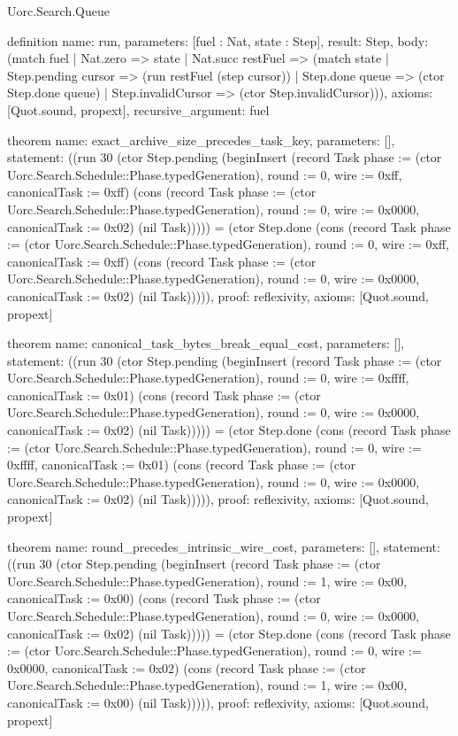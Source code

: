 \begin{lexlean}{Uorc.Search.Queue}
\begin{semanticmodule}
definition{
  name: run,
  parameters: [fuel : Nat, state : Step],
  result: Step,
  body: (match fuel
    | Nat.zero => state
    | Nat.succ restFuel => (match state
      | Step.pending cursor => (run restFuel (step cursor))
      | Step.done queue => (ctor Step.done queue)
      | Step.invalidCursor => (ctor Step.invalidCursor))),
  axioms: [Quot.sound, propext],
  recursive_argument: fuel
}

theorem{
  name: exact_archive_size_precedes_task_key,
  parameters: [],
  statement: ((run 30 (ctor Step.pending (beginInsert (record Task {phase := (ctor Uorc.Search.Schedule::Phase.typedGeneration), round := 0, wire := 0xff, canonicalTask := 0xff}) (cons (record Task {phase := (ctor Uorc.Search.Schedule::Phase.typedGeneration), round := 0, wire := 0x0000, canonicalTask := 0x02}) (nil Task))))) = (ctor Step.done (cons (record Task {phase := (ctor Uorc.Search.Schedule::Phase.typedGeneration), round := 0, wire := 0xff, canonicalTask := 0xff}) (cons (record Task {phase := (ctor Uorc.Search.Schedule::Phase.typedGeneration), round := 0, wire := 0x0000, canonicalTask := 0x02}) (nil Task))))),
  proof: reflexivity{},
  axioms: [Quot.sound, propext]
}

theorem{
  name: canonical_task_bytes_break_equal_cost,
  parameters: [],
  statement: ((run 30 (ctor Step.pending (beginInsert (record Task {phase := (ctor Uorc.Search.Schedule::Phase.typedGeneration), round := 0, wire := 0xffff, canonicalTask := 0x01}) (cons (record Task {phase := (ctor Uorc.Search.Schedule::Phase.typedGeneration), round := 0, wire := 0x0000, canonicalTask := 0x02}) (nil Task))))) = (ctor Step.done (cons (record Task {phase := (ctor Uorc.Search.Schedule::Phase.typedGeneration), round := 0, wire := 0xffff, canonicalTask := 0x01}) (cons (record Task {phase := (ctor Uorc.Search.Schedule::Phase.typedGeneration), round := 0, wire := 0x0000, canonicalTask := 0x02}) (nil Task))))),
  proof: reflexivity{},
  axioms: [Quot.sound, propext]
}

theorem{
  name: round_precedes_intrinsic_wire_cost,
  parameters: [],
  statement: ((run 30 (ctor Step.pending (beginInsert (record Task {phase := (ctor Uorc.Search.Schedule::Phase.typedGeneration), round := 1, wire := 0x00, canonicalTask := 0x00}) (cons (record Task {phase := (ctor Uorc.Search.Schedule::Phase.typedGeneration), round := 0, wire := 0x0000, canonicalTask := 0x02}) (nil Task))))) = (ctor Step.done (cons (record Task {phase := (ctor Uorc.Search.Schedule::Phase.typedGeneration), round := 0, wire := 0x0000, canonicalTask := 0x02}) (cons (record Task {phase := (ctor Uorc.Search.Schedule::Phase.typedGeneration), round := 1, wire := 0x00, canonicalTask := 0x00}) (nil Task))))),
  proof: reflexivity{},
  axioms: [Quot.sound, propext]
}


\end{semanticmodule}
\end{lexlean}
